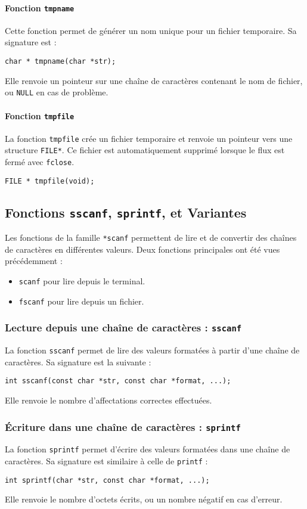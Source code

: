 \documentclass[french,11pt]{article}
\begin{document}
\paragraph{Fonction \texttt{tmpname}}
Cette fonction permet de générer un nom unique pour un fichier temporaire. Sa signature est :
\begin{verbatim}
char * tmpname(char *str);
\end{verbatim}
Elle renvoie un pointeur sur une chaîne de caractères contenant le nom de fichier, ou \texttt{NULL} en cas de problème.

\paragraph{Fonction \texttt{tmpfile}}
La fonction \texttt{tmpfile} crée un fichier temporaire et renvoie un pointeur vers une structure \texttt{FILE*}. Ce fichier est automatiquement supprimé lorsque le flux est fermé avec \texttt{fclose}.
\begin{verbatim}
FILE * tmpfile(void);
\end{verbatim}

\subsection{Fonctions \texttt{sscanf}, \texttt{sprintf}, et Variantes}
Les fonctions de la famille \texttt{*scanf} permettent de lire et de convertir des chaînes de caractères en différentes valeurs. Deux fonctions principales ont été vues précédemment :
\begin{itemize}
    \item \texttt{scanf} pour lire depuis le terminal.
    \item \texttt{fscanf} pour lire depuis un fichier.
\end{itemize}

\subsubsection{Lecture depuis une chaîne de caractères : \texttt{sscanf}}
La fonction \texttt{sscanf} permet de lire des valeurs formatées à partir d'une chaîne de caractères. Sa signature est la suivante :
\begin{verbatim}
int sscanf(const char *str, const char *format, ...);
\end{verbatim}
Elle renvoie le nombre d'affectations correctes effectuées.

\subsubsection{Écriture dans une chaîne de caractères : \texttt{sprintf}}
La fonction \texttt{sprintf} permet d'écrire des valeurs formatées dans une chaîne de caractères. Sa signature est similaire à celle de \texttt{printf} :
\begin{verbatim}
int sprintf(char *str, const char *format, ...);
\end{verbatim}
Elle renvoie le nombre d'octets écrits, ou un nombre négatif en cas d'erreur.
\end{document}
